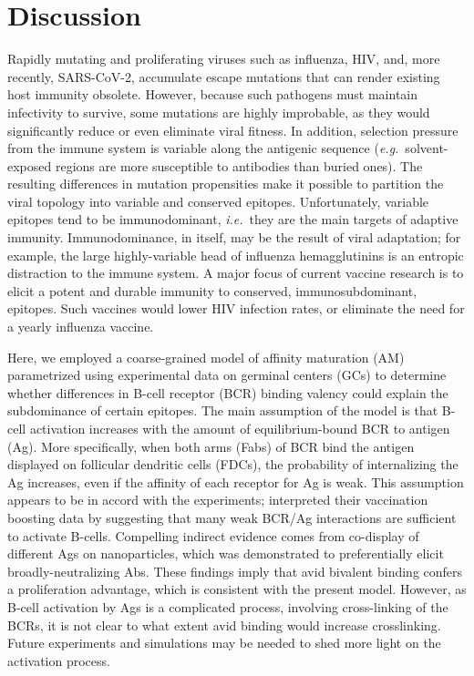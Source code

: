 \documentclass[utf8]{frontiersHLTH}%
\newcommand{\comment}[1]{} %
\def\ie {{\it i.e.}}
\def\eg {{\it e.g.}}
\begin{document}
\section{Discussion}
\label{sec:discussion}
Rapidly mutating and proliferating viruses such as influenza, HIV, and,
more recently, SARS-CoV-2, accumulate escape mutations that can
render existing host immunity obsolete. However, because such pathogens
must maintain infectivity to survive, some mutations are highly
improbable, as they would significantly reduce or even eliminate viral
fitness. In addition, selection pressure from the immune system is variable
along the antigenic sequence (\eg~solvent-exposed regions are more susceptible to antibodies than buried ones).
The resulting differences in mutation
propensities make it possible to partition the viral topology into variable and conserved epitopes.
Unfortunately, variable epitopes tend to be immunodominant, \ie~they are the main
targets of adaptive immunity. Immunodominance, in itself, may be the result of viral
adaptation; for example, the large highly-variable head of influenza hemagglutinins
is an entropic distraction to the immune system.
A major focus of current vaccine research is to elicit a potent and durable
immunity to conserved, immunosubdominant, epitopes.  Such vaccines
would
lower HIV infection rates, or eliminate the need for a yearly influenza
vaccine.

Here, we employed a coarse-grained model of affinity maturation (AM)
parametrized using experimental data on germinal centers
(GCs)\cite{wittenbrink11,weisel16,pelissier20} to determine whether
differences in B-cell receptor (BCR) binding valency could explain the
subdominance of certain epitopes. The main assumption of the model is
that B-cell activation increases with the amount of equilibrium-bound BCR
to antigen (Ag). More specifically, when both arms (Fabs) of BCR bind the antigen
displayed on follicular dendritic cells (FDCs), the probability of
internalizing the Ag increases, even if the affinity of each
receptor for Ag is weak. This assumption appears to be in accord with the
experiments;
\citet{arevalo20} interpreted their vaccination boosting data by
suggesting that many weak BCR/Ag interactions are sufficient to activate
B-cells. Compelling indirect evidence comes from co-display of
different Ags on nanoparticles, which was \comment{referring to co-display, which is singular} demonstrated to preferentially
elicit broadly-neutralizing Abs.  These findings\cite{kanekiyo19,cohen21}
imply that avid bivalent binding confers a proliferation advantage,
which is consistent with the present model. However, as B-cell activation by
Ags is
a complicated process, involving cross-linking of the BCRs, it is not
clear to what extent avid binding would increase crosslinking.
Future experiments and simulations may be needed to shed more light on the activation
process.
\end{document}
